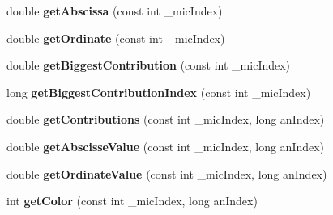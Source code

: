 \begin{DoxyCompactItemize}
\item 
\hypertarget{class_ambisonic_virtual_mic_u_i_manager_a6864d196d04531d70e15f1974fe6feab}{double {\bfseries get\-Abscissa} (const int \-\_\-mic\-Index)}\label{class_ambisonic_virtual_mic_u_i_manager_a6864d196d04531d70e15f1974fe6feab}

\item 
\hypertarget{class_ambisonic_virtual_mic_u_i_manager_a7b31fc1d5dea34eff580568fbb79cf64}{double {\bfseries get\-Ordinate} (const int \-\_\-mic\-Index)}\label{class_ambisonic_virtual_mic_u_i_manager_a7b31fc1d5dea34eff580568fbb79cf64}

\item 
\hypertarget{class_ambisonic_virtual_mic_u_i_manager_a53878af3132fd496f5ed47bf76723c19}{double {\bfseries get\-Biggest\-Contribution} (const int \-\_\-mic\-Index)}\label{class_ambisonic_virtual_mic_u_i_manager_a53878af3132fd496f5ed47bf76723c19}

\item 
\hypertarget{class_ambisonic_virtual_mic_u_i_manager_af14d2a345e8a6470ba1e8ad235ccef4b}{long {\bfseries get\-Biggest\-Contribution\-Index} (const int \-\_\-mic\-Index)}\label{class_ambisonic_virtual_mic_u_i_manager_af14d2a345e8a6470ba1e8ad235ccef4b}

\item 
\hypertarget{class_ambisonic_virtual_mic_u_i_manager_ab963d5e0747ffdc3cea9a974eeee0650}{double {\bfseries get\-Contributions} (const int \-\_\-mic\-Index, long an\-Index)}\label{class_ambisonic_virtual_mic_u_i_manager_ab963d5e0747ffdc3cea9a974eeee0650}

\item 
\hypertarget{class_ambisonic_virtual_mic_u_i_manager_a1a299ad41aae90dc679569a8b5ba3404}{double {\bfseries get\-Abscisse\-Value} (const int \-\_\-mic\-Index, long an\-Index)}\label{class_ambisonic_virtual_mic_u_i_manager_a1a299ad41aae90dc679569a8b5ba3404}

\item 
\hypertarget{class_ambisonic_virtual_mic_u_i_manager_ac933c6844c2620a561953fb9eee34bba}{double {\bfseries get\-Ordinate\-Value} (const int \-\_\-mic\-Index, long an\-Index)}\label{class_ambisonic_virtual_mic_u_i_manager_ac933c6844c2620a561953fb9eee34bba}

\item 
\hypertarget{class_ambisonic_virtual_mic_u_i_manager_a55ea8a1f8f8969dd9ee0026446577ff3}{int {\bfseries get\-Color} (const int \-\_\-mic\-Index, long an\-Index)}\label{class_ambisonic_virtual_mic_u_i_manager_a55ea8a1f8f8969dd9ee0026446577ff3}


\end{DoxyCompactItemize}
